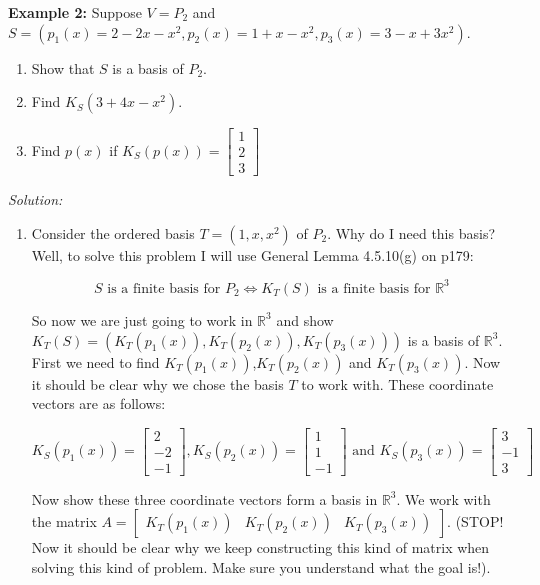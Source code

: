 \documentclass[12pt]{article}
\begin{document}
{\bf Example 2:} Suppose $V=P_2$ and $S=(p_1(x)=2-2x-x^2,p_2(x)=1+x-x^2,p_3(x)=3-x+3x^2)$.
\begin{enumerate}
\item Show that $S$ is a basis of $P_2$.
\item Find $K_S(3+4x-x^2)$.
\item Find $p(x)$ if $K_S(p(x))=  \left[\begin{array}{r} 1\\2\\3 \end{array}\right]$
\end{enumerate}
{\it Solution:}
\begin{enumerate}
\item Consider the ordered basis $T=(1,x,x^2)$ of $P_2$.  Why do I need this basis?  Well, to solve this problem I will use General Lemma 4.5.10(g) on p179:

\[ S \text{ is a finite basis for } P_2 \iff K_T(S) \text{ is a finite basis for } \mathbb{R}^3 \]

So now we are just going to work in $\mathbb{R}^3$ and show $K_T(S)=(K_T(p_1(x)),K_T(p_2(x)),K_T(p_3(x)))$ is a basis of $\mathbb{R}^3$.  First we need to find  $K_T(p_1(x))$,$K_T(p_2(x))$ and $K_T(p_3(x))$.  Now it should be clear why we chose the basis $T$ to work with.  These coordinate vectors are as follows:
\begin{center}
$K_S(p_1(x))=  \left[\begin{array}{r} 2\\-2\\-1 \end{array}\right], K_S(p_2(x))=  \left[\begin{array}{r} 1\\1\\-1 \end{array}\right] \text{ and } K_S(p_3(x))=  \left[\begin{array}{r} 3\\-1\\3 \end{array}\right]$
\end{center}
Now show these three coordinate vectors form a basis in $\mathbb{R}^3$.  We work with the matrix $A=\left[ \begin{array}{lll} K_T(p_1(x))& K_T(p_2(x)) & K_T(p_3(x)) \end{array} \right]$. (STOP! Now it should be clear why we keep constructing this kind of matrix when solving this kind of problem.  Make sure you understand what the goal is!).


\end{enumerate}
\end{document}
